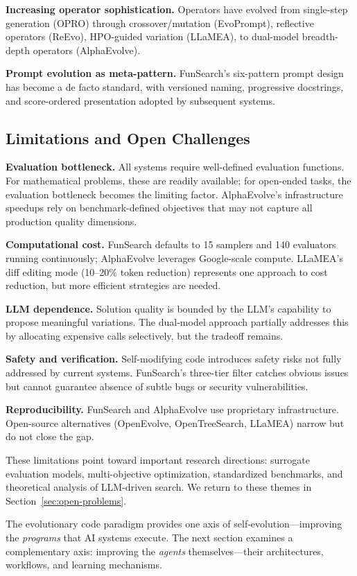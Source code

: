 \textbf{Increasing operator sophistication.} Operators have evolved from single-step generation (OPRO) through crossover/mutation (EvoPrompt), reflective operators (ReEvo), HPO-guided variation (LLaMEA), to dual-model breadth-depth operators (AlphaEvolve).

\textbf{Prompt evolution as meta-pattern.} FunSearch's six-pattern prompt design has become a de facto standard, with versioned naming, progressive docstrings, and score-ordered presentation adopted by subsequent systems.

\subsection{Limitations and Open Challenges}
\label{sec:evo-limitations}

\textbf{Evaluation bottleneck.} All systems require well-defined evaluation functions. For mathematical problems, these are readily available; for open-ended tasks, the evaluation bottleneck becomes the limiting factor. AlphaEvolve's infrastructure speedups rely on benchmark-defined objectives that may not capture all production quality dimensions.

\textbf{Computational cost.} FunSearch defaults to 15 samplers and 140 evaluators running continuously; AlphaEvolve leverages Google-scale compute. LLaMEA's diff editing mode (10--20\% token reduction) represents one approach to cost reduction, but more efficient strategies are needed.

\textbf{LLM dependence.} Solution quality is bounded by the LLM's capability to propose meaningful variations. The dual-model approach partially addresses this by allocating expensive calls selectively, but the tradeoff remains.

\textbf{Safety and verification.} Self-modifying code introduces safety risks not fully addressed by current systems. FunSearch's three-tier filter catches obvious issues but cannot guarantee absence of subtle bugs or security vulnerabilities.

\textbf{Reproducibility.} FunSearch and AlphaEvolve use proprietary infrastructure. Open-source alternatives (OpenEvolve, OpenTreeSearch, LLaMEA) narrow but do not close the gap.

These limitations point toward important research directions: surrogate evaluation models, multi-objective optimization, standardized benchmarks, and theoretical analysis of LLM-driven search. We return to these themes in Section~\ref{sec:open-problems}.

The evolutionary code paradigm provides one axis of self-evolution---improving the \emph{programs} that AI systems execute. The next section examines a complementary axis: improving the \emph{agents} themselves---their architectures, workflows, and learning mechanisms.
